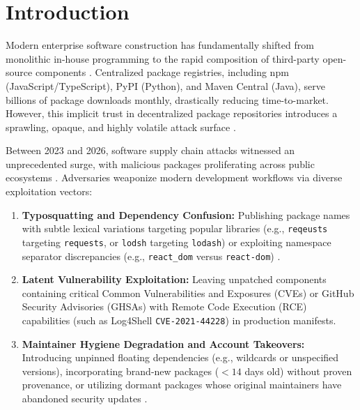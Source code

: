 \section{Introduction}
\label{sec:intro}

Modern enterprise software construction has fundamentally shifted from monolithic in-house programming to the rapid composition of third-party open-source components \cite{ladisa2023sok}. Centralized package registries, including npm (JavaScript/TypeScript), PyPI (Python), and Maven Central (Java), serve billions of package downloads monthly, drastically reducing time-to-market. However, this implicit trust in decentralized package repositories introduces a sprawling, opaque, and highly volatile attack surface \cite{ladisa2023sok}. 

Between 2023 and 2026, software supply chain attacks witnessed an unprecedented surge, with malicious packages proliferating across public ecosystems \cite{davis2025typosmart}. Adversaries weaponize modern development workflows via diverse exploitation vectors:
\begin{enumerate}
    \item \textbf{Typosquatting and Dependency Confusion:} Publishing package names with subtle lexical variations targeting popular libraries (e.g., \texttt{reqeusts} targeting \texttt{requests}, or \texttt{lodsh} targeting \texttt{lodash}) or exploiting namespace separator discrepancies (e.g., \texttt{react\_dom} versus \texttt{react-dom}) \cite{davis2025typosmart}.
    \item \textbf{Latent Vulnerability Exploitation:} Leaving unpatched components containing critical Common Vulnerabilities and Exposures (CVEs) or GitHub Security Advisories (GHSAs) with Remote Code Execution (RCE) capabilities (such as Log4Shell \texttt{CVE-2021-44228}) in production manifests.
    \item \textbf{Maintainer Hygiene Degradation and Account Takeovers:} Introducing unpinned floating dependencies (e.g., wildcards or unspecified versions), incorporating brand-new packages ($< 14$ days old) without proven provenance, or utilizing dormant packages whose original maintainers have abandoned security updates \cite{ladisa2023sok, hegewald2025openssf}.
\end{enumerate}

